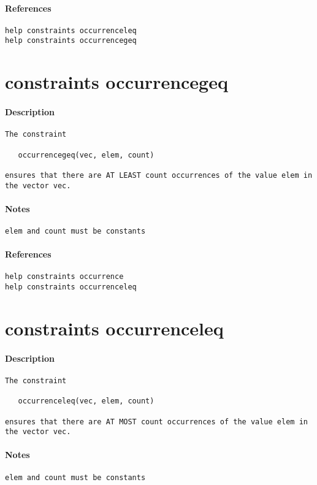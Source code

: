 \paragraph{References}
{\footnotesize
\begin{verbatim}
help constraints occurrenceleq
help constraints occurrencegeq
\end{verbatim}
}
\section{constraints occurrencegeq}
\paragraph{Description}
{\footnotesize
\begin{verbatim}
The constraint

   occurrencegeq(vec, elem, count)

ensures that there are AT LEAST count occurrences of the value elem in
the vector vec.
\end{verbatim}
}
\paragraph{Notes}
{\footnotesize
\begin{verbatim}
elem and count must be constants
\end{verbatim}
}
\paragraph{References}
{\footnotesize
\begin{verbatim}
help constraints occurrence
help constraints occurrenceleq
\end{verbatim}
}
\section{constraints occurrenceleq}
\paragraph{Description}
{\footnotesize
\begin{verbatim}
The constraint

   occurrenceleq(vec, elem, count)

ensures that there are AT MOST count occurrences of the value elem in
the vector vec.
\end{verbatim}
}
\paragraph{Notes}
{\footnotesize
\begin{verbatim}
elem and count must be constants
\end{verbatim}
}
